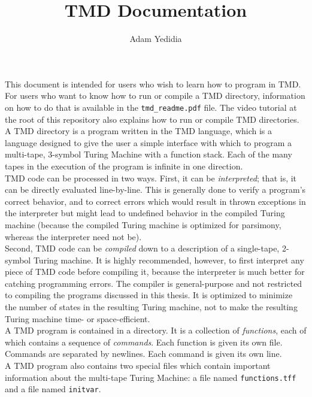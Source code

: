 \documentclass[11pt]{article}
\title{TMD Documentation}
\author{Adam Yedidia}
\begin{document}
    
\maketitle

This document is intended for users who wish to learn how to program in TMD. For users who want to know how to run or compile a TMD directory, information on how to do that is available in the \texttt{tmd_readme.pdf} file. The video tutorial at the root of this repository also explains how to run or compile TMD directories. \\

A TMD directory is a program written in the TMD language, which is a language designed to give the user a simple interface with which to program a multi-tape, 3-symbol Turing Machine with a function stack. Each of the many tapes in the execution of the program is infinite in one direction. \\

TMD code can be processed in two ways. First, it can be \emph{interpreted}; that is, it can be directly evaluated line-by-line. This is generally done to verify a program's correct behavior, and to correct errors which would result in thrown exceptions in the interpreter but might lead to undefined behavior in the compiled Turing machine (because the compiled Turing machine is optimized for parsimony, whereas the interpreter need not be). \\

Second, TMD code can be \emph{compiled} down to a description of a single-tape, 2-symbol Turing machine. It is highly recommended, however, to first interpret any piece of TMD code before compiling it, because the interpreter is much better for catching programming errors. The compiler is general-purpose and not restricted to compiling the programs discussed in this thesis. It is optimized to minimize the number of states in the resulting Turing machine, not to make the resulting Turing machine time- or space-efficient. \\

A TMD program is contained in a directory. It is a collection of \emph{functions}, each of which contains a sequence of \emph{commands}. Each function is given its own file. Commands are separated by newlines. Each command is given its own line. \\

A TMD program also contains two special files which contain important information about the multi-tape Turing Machine: a file named {\tt functions.tff} and a file named {\tt initvar}. \\ 
\end{document}
